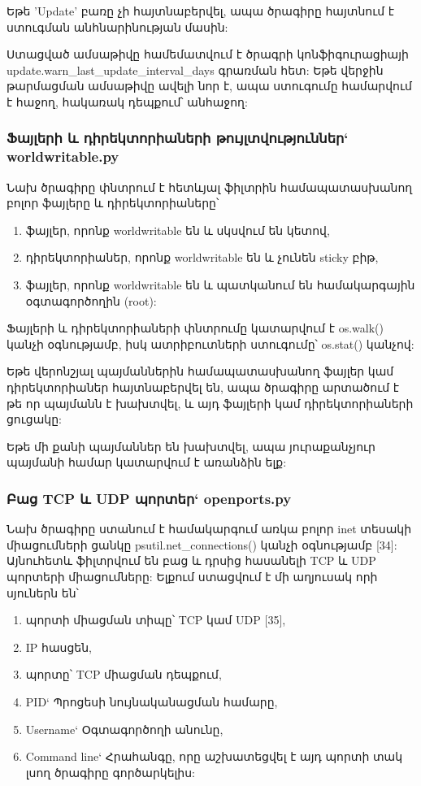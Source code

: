 \documentclass[a4paper,12pt]{article}
\begin{document}
\begin{sloppypar}
\begin{itemize}
	Եթե 'Update' բառը չի հայտնաբերվել, ապա ծրագիրը հայտնում է ստուգման անհնարինության մասին:
\end{itemize}

Ստացված ամսաթիվը համեմատվում է ծրագրի կոնֆիգուրացիայի
update.warn\_last\_update\_interval\_days
գրառման հետ: Եթե վերջին թարմացման ամսաթիվը ավելի նոր է,
ապա ստուգումը համարվում է հաջող, հակառակ դեպքում՝ անհաջող:


\subsubsection{Ֆայլերի և դիրեկտորիաների թույլտվություններ` worldwritable.py}


Նախ ծրագիրը փնտրում է հետևյալ ֆիլտրին համապատասխանող բոլոր ֆայլերը և դիրեկտորիաները՝

\begin{enumerate}
\item ֆայլեր, որոնք worldwritable են և սկսվում են կետով,
\item դիրեկտորիաներ, որոնք worldwritable են և չունեն sticky բիթ,
\item ֆայլեր, որոնք worldwritable են և պատկանում են համակարգային օգտագործողին (root):
\end{enumerate}

Ֆայլերի և դիրեկտորիաների փնտրումը կատարվում է os.walk() կանչի օգնությամբ,
իսկ ատրիբուտների ստուգումը՝ os.stat() կանչով:

Եթե վերոնշյալ պայմաններին համապատասխանող ֆայլեր կամ դիրեկտորիաներ հայտնաբերվել են,
ապա ծրագիրը արտածում է թե որ պայմանն է խախտվել, և այդ ֆայլերի կամ դիրեկտորիաների
ցուցակը:

Եթե մի քանի պայմաններ են խախտվել, ապա յուրաքանչյուր պայմանի համար կատարվում է
առանձին ելք:


\subsubsection{Բաց TCP և UDP պորտեր` openports.py}


Նախ ծրագիրը ստանում է համակարգում առկա բոլոր inet տեսակի միացումների ցանկը
psutil.net\_connections() կանչի օգնությամբ [34]:
Այնուհետև ֆիլտրվում են բաց և դրսից հասանելի TCP և UDP պորտերի միացումները:
Ելքում ստացվում է մի աղյուսակ որի սյուներն են՝

\begin{enumerate}
\item պորտի միացման տիպը՝ TCP կամ UDP [35],
\item IP հասցեն,
\item պորտը՝ TCP միացման դեպքում,
\item PID` Պրոցեսի նույնականացման համարը,
\item Username` Օգտագործողի անունը,
\item Command line` Հրահանգը, որը աշխատեցվել է այդ պորտի տակ լսող ծրագիրը գործարկելիս:
\end{enumerate}



\end{sloppypar}
\end{document}
